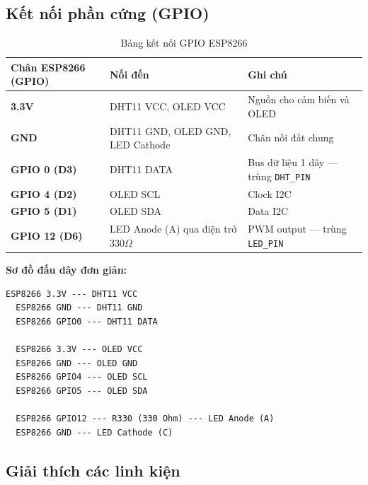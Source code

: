 \documentclass[13pt,a4paper]{article}
\newcommand{\code}[1]{\texttt{#1}}
\begin{document}
\subsection{Kết nối phần cứng (GPIO)}
\label{sec:ketnoi}

\begin{table}[htbp]
    \centering
    \caption{Bảng kết nối GPIO ESP8266}
    \label{tbl:gpio}
    \begin{tabular}{|L{4.5cm}|C{5cm}|C{4cm}|}
        \hline
        \textbf{Chân ESP8266 (GPIO)} & \textbf{Nối đến} & \textbf{Ghi chú} \\
        \hline
        \textbf{3.3V} & DHT11 VCC, OLED VCC & Nguồn cho cảm biến và OLED \\
        \hline
        \textbf{GND} & DHT11 GND, OLED GND, LED Cathode & Chân nối đất chung \\
        \hline
        \textbf{GPIO 0 (D3)} & DHT11 DATA & Bus dữ liệu 1 dây --- trùng \code{DHT\_PIN} \\
        \hline
        \textbf{GPIO 4 (D2)} & OLED SCL & Clock I2C \\
        \hline
        \textbf{GPIO 5 (D1)} & OLED SDA & Data I2C \\
        \hline
        \textbf{GPIO 12 (D6)} & LED Anode (A) qua điện trở 330$\Omega$ & PWM output --- trùng \code{LED\_PIN} \\
        \hline
    \end{tabular}
\end{table}

\textbf{Sơ đồ đấu dây đơn giản:}

\begin{lstlisting}[style=flowcode, caption={Sơ đồ đấu dây}, label={lst:wiring}]
  ESP8266 3.3V --- DHT11 VCC
  ESP8266 GND --- DHT11 GND
  ESP8266 GPIO0 --- DHT11 DATA

  ESP8266 3.3V --- OLED VCC
  ESP8266 GND --- OLED GND
  ESP8266 GPIO4 --- OLED SCL
  ESP8266 GPIO5 --- OLED SDA

  ESP8266 GPIO12 --- R330 (330 Ohm) --- LED Anode (A)
  ESP8266 GND --- LED Cathode (C)
\end{lstlisting}

\subsection{Giải thích các linh kiện}
\label{sec:linhkien}
\end{document}
